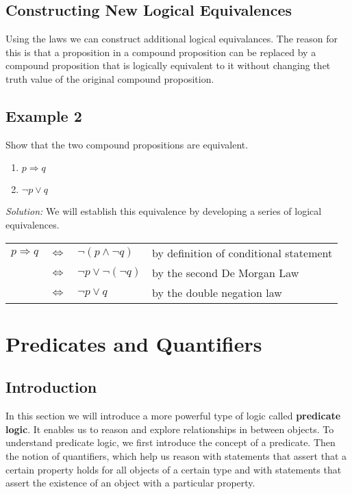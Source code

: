 \documentclass{article}
\begin{document}
\subsection{Constructing New Logical Equivalences}
Using the laws we can construct additional logical equivalances. The reason for this is that a proposition
in a compound proposition can be replaced by a compound proposition that is logically equivalent to it without changing
thet truth value of the original compound proposition.

\subsection*{Example 2}
Show that the two compound propositions are equivalent.
\begin{enumerate}
	\item $p \Rightarrow q$
	\item $\neg p \vee q$
\end{enumerate}

\noindent \textit{Solution:} We will establish this equivalence by developing a series of logical equivalences.
\begin{center}
	\begin{tabular}{l l l l}
		$p \Rightarrow q$ & $\Leftrightarrow$ & $\neg (p \wedge \neg q)$    & by definition of conditional statement \\
		                  & $\Leftrightarrow$ & $\neg p \vee \neg (\neg q)$ & by the second De Morgan Law            \\
		                  & $\Leftrightarrow$ & $\neg p \vee q$             & by the double negation law
	\end{tabular}

\end{center}

\section{Predicates and Quantifiers}
\subsection*{Introduction}
In this section we will introduce a more powerful type of logic called \textbf{predicate logic}.
It enables us to reason and explore relationships in between objects. To understand predicate logic,
we first introduce the concept of a predicate. Then the notion of quantifiers, which help us
reason with statements that assert that a certain property holds for all objects of a certain
type and with statements that assert the existence of an object with a particular property.
\end{document}

